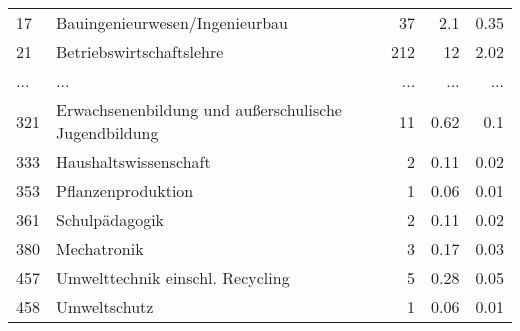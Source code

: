 \begin{longtable}{lXrrr}
        17 & \multicolumn{1}{X}{Bauingenieurwesen/Ingenieurbau} & %
          \num{37} &
          \num[round-mode=places,round-precision=2]{2,1} &
          \num[round-mode=places,round-precision=2]{0,35} \\
        21 & \multicolumn{1}{X}{Betriebswirtschaftslehre} & %
          \num{212} &
          \num[round-mode=places,round-precision=2]{12} &
          \num[round-mode=places,round-precision=2]{2,02} \\
       ... & ... & ... & ... & ... \\
        321 & \multicolumn{1}{X}{Erwachsenenbildung und außerschulische Jugendbildung} & %
          \num{11} &
          \num[round-mode=places,round-precision=2]{0,62} &
          \num[round-mode=places,round-precision=2]{0,1} \\

        333 & \multicolumn{1}{X}{Haushaltswissenschaft} & %
          \num{2} &
          \num[round-mode=places,round-precision=2]{0,11} &
          \num[round-mode=places,round-precision=2]{0,02} \\

        353 & \multicolumn{1}{X}{Pflanzenproduktion} & %
          \num{1} &
          \num[round-mode=places,round-precision=2]{0,06} &
          \num[round-mode=places,round-precision=2]{0,01} \\

        361 & \multicolumn{1}{X}{Schulpädagogik} & %
          \num{2} &
          \num[round-mode=places,round-precision=2]{0,11} &
          \num[round-mode=places,round-precision=2]{0,02} \\

        380 & \multicolumn{1}{X}{Mechatronik} & %
          \num{3} &
          \num[round-mode=places,round-precision=2]{0,17} &
          \num[round-mode=places,round-precision=2]{0,03} \\

        457 & \multicolumn{1}{X}{Umwelttechnik einschl. Recycling} & %
          \num{5} &
          \num[round-mode=places,round-precision=2]{0,28} &
          \num[round-mode=places,round-precision=2]{0,05} \\

        458 & \multicolumn{1}{X}{Umweltschutz} & %
          \num{1} &
          \num[round-mode=places,round-precision=2]{0,06} &
          \num[round-mode=places,round-precision=2]{0,01} \\


\end{longtable}

